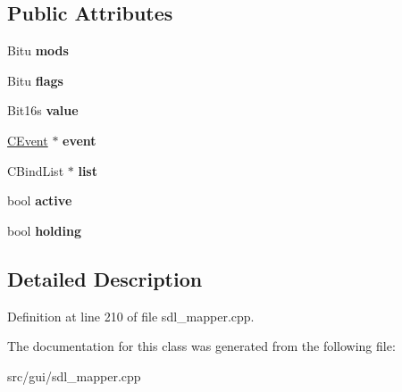 \subsection*{Public Attributes}
\begin{DoxyCompactItemize}
\item 
\hypertarget{classCBind_a91f9c2be14e33caf50f7be9157e67cc8}{Bitu {\bfseries mods}}\label{classCBind_a91f9c2be14e33caf50f7be9157e67cc8}

\item 
\hypertarget{classCBind_a3d65630e149aa1df6f84cc78851f4d6c}{Bitu {\bfseries flags}}\label{classCBind_a3d65630e149aa1df6f84cc78851f4d6c}

\item 
\hypertarget{classCBind_afff7b6160648ad63671611c53b1b6a7e}{Bit16s {\bfseries value}}\label{classCBind_afff7b6160648ad63671611c53b1b6a7e}

\item 
\hypertarget{classCBind_a5a1677133911a7bc26357f56acc9f4dd}{\hyperlink{classCEvent}{C\-Event} $\ast$ {\bfseries event}}\label{classCBind_a5a1677133911a7bc26357f56acc9f4dd}

\item 
\hypertarget{classCBind_a8adfc03bb65f5a8637d2c35c0b604822}{C\-Bind\-List $\ast$ {\bfseries list}}\label{classCBind_a8adfc03bb65f5a8637d2c35c0b604822}

\item 
\hypertarget{classCBind_ae469e84d9c8d985542ff5a65d6c86810}{bool {\bfseries active}}\label{classCBind_ae469e84d9c8d985542ff5a65d6c86810}

\item 
\hypertarget{classCBind_a4a0d6d7650d3a24cc0bc68c985d26ade}{bool {\bfseries holding}}\label{classCBind_a4a0d6d7650d3a24cc0bc68c985d26ade}

\end{DoxyCompactItemize}


\subsection{Detailed Description}


Definition at line 210 of file sdl\-\_\-mapper.\-cpp.



The documentation for this class was generated from the following file\-:\begin{DoxyCompactItemize}
\item 
src/gui/sdl\-\_\-mapper.\-cpp\end{DoxyCompactItemize}
